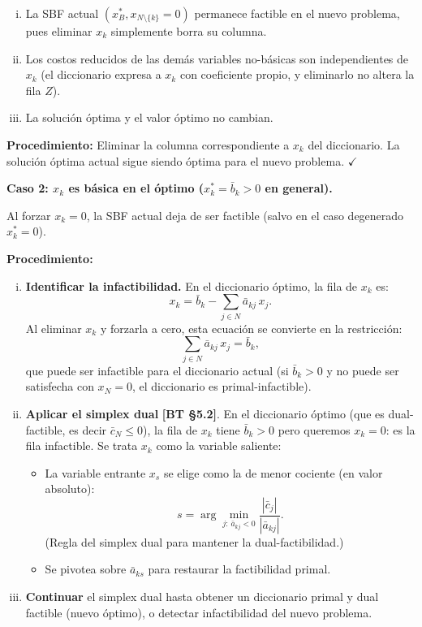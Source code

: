 \documentclass{article}
\begin{document}
\begin{enumerate}[(i)]
  \item La SBF actual $(x_B^*, x_{N \setminus \{k\}} = 0)$ permanece factible en el nuevo problema, pues eliminar $x_k$ simplemente borra su columna.
  \item Los costos reducidos de las demás variables no-básicas son independientes de $x_k$ (el diccionario expresa a $x_k$ con coeficiente propio, y eliminarlo no altera la fila $Z$).
  \item La solución óptima y el valor óptimo no cambian.
\end{enumerate}

\textbf{Procedimiento:} Eliminar la columna correspondiente a $x_k$ del diccionario. La solución óptima actual sigue siendo óptima para el nuevo problema. $\checkmark$

\medskip
\textbf{Caso 2: $x_k$ es básica en el óptimo ($x_k^* = \bar{b}_k > 0$ en general).}

Al forzar $x_k = 0$, la SBF actual deja de ser factible (salvo en el caso degenerado $x_k^* = 0$).

\textbf{Procedimiento:}

\begin{enumerate}[(i)]
  \item \textbf{Identificar la infactibilidad.} En el diccionario óptimo, la fila de $x_k$ es:
  \[
    x_k = \bar{b}_k - \sum_{j \in N} \bar{a}_{kj}\, x_j.
  \]
  Al eliminar $x_k$ y forzarla a cero, esta ecuación se convierte en la restricción:
  \[
    \sum_{j \in N} \bar{a}_{kj}\, x_j = \bar{b}_k,
  \]
  que puede ser infactible para el diccionario actual (si $\bar{b}_k > 0$ y no puede ser satisfecha con $x_N = 0$, el diccionario es primal-infactible).

  \item \textbf{Aplicar el simplex dual} \textbf{[BT §5.2]}. En el diccionario óptimo (que es dual-factible, es decir $\bar{c}_N \leq 0$), la fila de $x_k$ tiene $\bar{b}_k > 0$ pero queremos $x_k = 0$: es la fila infactible. Se trata $x_k$ como la variable saliente:
  \begin{itemize}
    \item La variable entrante $x_s$ se elige como la de menor cociente (en valor absoluto):
    \[
      s = \arg\min_{j:\, \bar{a}_{kj} < 0} \frac{|\bar{c}_j|}{|\bar{a}_{kj}|}.
    \]
    (Regla del simplex dual para mantener la dual-factibilidad.)
    \item Se pivotea sobre $\bar{a}_{ks}$ para restaurar la factibilidad primal.
  \end{itemize}

  \item \textbf{Continuar} el simplex dual hasta obtener un diccionario primal y dual factible (nuevo óptimo), o detectar infactibilidad del nuevo problema.
\end{enumerate}
\end{document}
